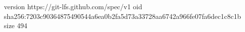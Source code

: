 version https://git-lfs.github.com/spec/v1
oid sha256:7203c90364875490544a6ea0b2fa5d73a33728aa6742a966fe07fa6dec1c8c1b
size 494
